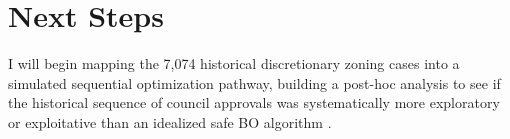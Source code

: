 \documentclass[11pt,twoside]{article}
\begin{document}
\section*{Next Steps}
I will begin mapping the 7,074 historical discretionary zoning cases into a simulated sequential optimization pathway, building a post-hoc analysis to see if the historical sequence of council approvals was systematically more exploratory or exploitative than an idealized safe BO algorithm \citep{sui2015safeopt}.

\vspace{-0.5em}
{\scriptsize
\setlength{\bibsep}{0pt}


}
\end{document}
